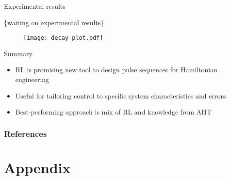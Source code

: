 \documentclass{beamer}
\begin{document}
\begin{frame}{Experimental results}

\{waiting on experimental results\}

\begin{figure}
\centering
\texttt{[image: decay\_plot.pdf]}
\end{figure}


\end{frame}

\begin{frame}{Summary}

\begin{itemize}
    \item RL is promising new tool to design pulse sequences for Hamiltonian engineering
    \item Useful for tailoring control to specific system characteristics and errors
    \item Best-performing approach is mix of RL and knowledge from AHT
\end{itemize}

\end{frame}

\begin{frame}[allowframebreaks]
\frametitle{References}

\printbibliography

\end{frame}
















\section{Appendix}
\end{document}
